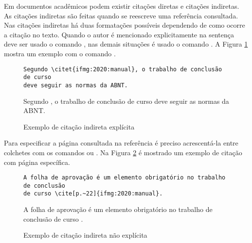Em documentos acadêmicos podem existir citações diretas e citações indiretas. As citações indiretas são feitas quando se reescreve uma referência consultada. Nas citações indiretas há duas formatações possíveis dependendo de como ocorre a citação no texto. Quando o autor é mencionado explicitamente na sentença deve ser usado o comando , nas demais situações é usado o comando . A Figura \ref{figura:citacao_indireta_explicita} mostra um exemplo com o comando .


\begin{figure}[!htb]
\caption{Exemplo de citação indireta explícita} \label{figura:citacao_indireta_explicita}

\hrulefill\vspace*{-1em}

\begin{verbatim}
Segundo \citet{ifmg:2020:manual}, o trabalho de conclusão de curso
deve seguir as normas da ABNT.
\end{verbatim}

\vspace*{-1.5em}\hrulefill

Segundo \citet{ifmg:2020:manual}, o trabalho de conclusão de curso deve seguir as normas da ABNT.

\vspace*{-0.5em}\hrulefill
{}
\end{figure}


Para especificar a página consultada na referência é preciso acrescentá-la entre colchetes com os comandos  ou . Na Figura \ref{figura:citacao_indireta_pagina} é mostrado um exemplo de citação com página específica.


\begin{figure}[!htb]
\caption{Exemplo de citação indireta não explícita} \label{figura:citacao_indireta_pagina}
\hrulefill\vspace*{-1em}

\begin{verbatim}
A folha de aprovação é um elemento obrigatório no trabalho de conclusão
de curso \cite[p.~22]{ifmg:2020:manual}.
\end{verbatim}

\vspace*{-1.5em}\hrulefill

A folha de aprovação é um elemento obrigatório no trabalho de conclusão de curso \cite[p.~22]{ifmg:2020:manual}.

\vspace*{-0.5em}\hrulefill
{}
\end{figure}

